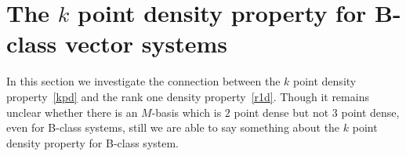 \documentclass[12pt,oneside,a4paper]{amsart}
\begin{document}



    \section{The $k$ point density property for B-class vector systems}
      In this section we investigate the connection between the $k$ point density property~\eqref{kpd} and
        the rank one density property~\eqref{r1d}.
      Though it remains unclear whether there is an $M$-basis which is $2$ point dense but not $3$ point dense,
        even for B-class systems, still we are able to say something about the $k$ point density property for B-class system.
\end{document}
